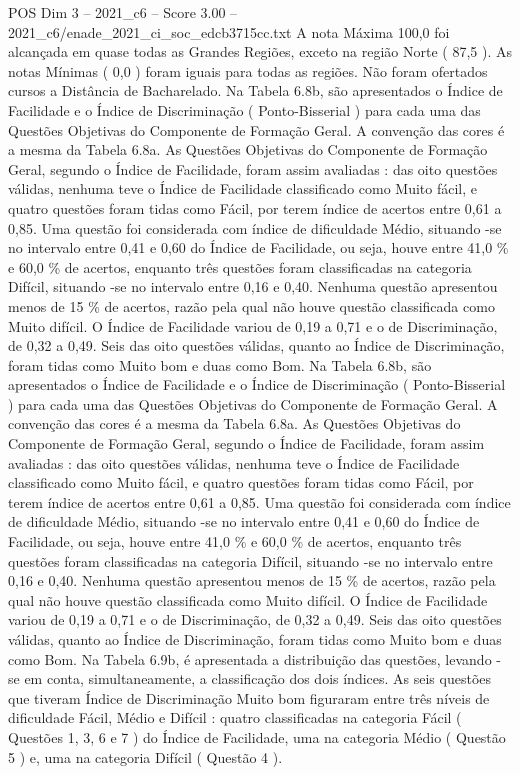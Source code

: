 \begin{textsample}{POS Dim 3 – 2021\_c6 – Score 3.00 – 2021\_c6/enade\_2021\_ci\_soc\_edcb3715cc.txt}
A nota Máxima 100,0 foi alcançada em quase todas as Grandes Regiões, exceto na região Norte ( 87,5 ).
As notas Mínimas ( 0,0 ) foram iguais para todas as regiões.
Não foram ofertados cursos a Distância de Bacharelado.
Na Tabela 6.8b, são apresentados o Índice de Facilidade e o Índice de Discriminação ( Ponto-Bisserial ) para cada uma das Questões Objetivas do Componente de Formação Geral.
A convenção das cores é a mesma da Tabela 6.8a.
As Questões Objetivas do Componente de Formação Geral, segundo o Índice de Facilidade, foram assim avaliadas : das oito questões válidas, nenhuma teve o Índice de Facilidade classificado como Muito fácil, e quatro questões foram tidas como Fácil, por terem índice de acertos entre 0,61 a 0,85.
Uma questão foi considerada com índice de dificuldade Médio, situando -se no intervalo entre 0,41 e 0,60 do Índice de Facilidade, ou seja, houve entre 41,0 \% e 60,0 \% de acertos, enquanto três questões foram classificadas na categoria Difícil, situando -se no intervalo entre 0,16 e 0,40.
Nenhuma questão apresentou menos de 15 \% de acertos, razão pela qual não houve questão classificada como Muito difícil.
O Índice de Facilidade variou de 0,19 a 0,71 e o de Discriminação, de 0,32 a 0,49.
Seis das oito questões válidas, quanto ao Índice de Discriminação, foram tidas como Muito bom e duas como Bom.
Na Tabela 6.8b, são apresentados o Índice de Facilidade e o Índice de Discriminação ( Ponto-Bisserial ) para cada uma das Questões Objetivas do Componente de Formação Geral.
A convenção das cores é a mesma da Tabela 6.8a.
As Questões Objetivas do Componente de Formação Geral, segundo o Índice de Facilidade, foram assim avaliadas : das oito questões válidas, nenhuma teve o Índice de Facilidade classificado como Muito fácil, e quatro questões foram tidas como Fácil, por terem índice de acertos entre 0,61 a 0,85.
Uma questão foi considerada com índice de dificuldade Médio, situando -se no intervalo entre 0,41 e 0,60 do Índice de Facilidade, ou seja, houve entre 41,0 \% e 60,0 \% de acertos, enquanto três questões foram classificadas na categoria Difícil, situando -se no intervalo entre 0,16 e 0,40.
Nenhuma questão apresentou menos de 15 \% de acertos, razão pela qual não houve questão classificada como Muito difícil.
O Índice de Facilidade variou de 0,19 a 0,71 e o de Discriminação, de 0,32 a 0,49.
Seis das oito questões válidas, quanto ao Índice de Discriminação, foram tidas como Muito bom e duas como Bom.
Na Tabela 6.9b, é apresentada a distribuição das questões, levando -se em conta, simultaneamente, a classificação dos dois índices.
As seis questões que tiveram Índice de Discriminação Muito bom figuraram entre três níveis de dificuldade Fácil, Médio e Difícil : quatro classificadas na categoria Fácil ( Questões 1, 3, 6 e 7 ) do Índice de Facilidade, uma na categoria Médio ( Questão 5 ) e, uma na categoria Difícil ( Questão 4 ).

\end{textsample}

